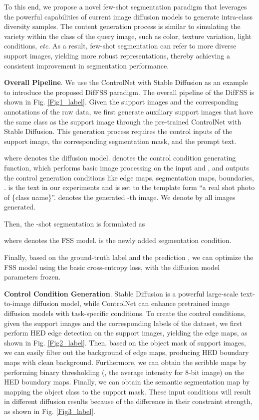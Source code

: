 \documentclass[sigconf]{acmart}
\begin{document}
To this end, we propose a novel few-shot segmentation paradigm that leverages the powerful capabilities of current image diffusion models to generate intra-class diversity samples. The content generation process is similar to simulating the variety within the class of the query image, such as color, texture variation, light conditions, \textit{etc}. As a result, few-shot segmentation can refer to more diverse support images, yielding more robust representations, thereby achieving a consistent improvement in segmentation performance.

\textbf{Overall Pipeline}. We use the ControlNet with Stable Diffusion \cite{zhang2023adding} as an example to introduce the proposed DifFSS paradigm. The overall pipeline of the DifFSS is shown in Fig. \ref{Fig1_label}. Given the support images and the corresponding annotations of the raw data, we first generate auxiliary support images that have the same class as the support image through the pre-trained ControlNet with Stable Diffusion. This generation process requires the control inputs of the support image, the corresponding segmentation mask, and the prompt text. 



where  denotes the diffusion model.  denotes the control condition generating function, which performs basic image processing on the input  and , and outputs the control generation conditions like edge maps, segmentation maps, boundaries, .  is the text in our experiments and is set to the template form ``a real shot photo of \{class name\}''.  denotes the generated -th image. We denote by  all  images generated.


Then, the -shot segmentation is formulated as

where  denotes the FSS model.  is the newly added segmentation condition.

Finally, based on the ground-truth label  and the prediction , we can optimize the FSS model  using the basic cross-entropy loss, with the diffusion model parameters frozen.



\textbf{Control Condition Generation}. Stable Diffusion is a powerful large-scale text-to-image diffusion model, while ControlNet \cite{zhang2023adding} can enhance pretrained image diffusion models with task-specific conditions. To create the control conditions, given the support images and the corresponding labels of the dataset, we first perform HED edge detection \cite{xie2015holistically} on the support images, yielding the edge maps, as shown in Fig. \ref{Fig2_label}. Then, based on the object mask of support images, we can easily filter out the background of edge maps, producing HED boundary maps with clean background. Furthermore, we can obtain the scribble maps by performing binary thresholding (, the average intensity for 8-bit image) on the HED boundary maps. Finally, we can obtain the semantic segmentation map by mapping the object class to the support mask. These input conditions will result in different diffusion results because of the difference in their constraint strength, as shown in Fig. \ref{Fig3_label}.
\end{document}
